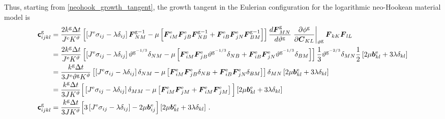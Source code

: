 \documentclass[10pt,letterpaper,oneside]{report}
\newcommand{\ten}[1]{\mbox{\boldmath $#1$}{}}
\newcommand{\tenf}[1]{\mbox{{\sffamily{\bfseries {#1}}}}}
\newcommand{\scas}[1]{\mbox{{\scriptsize{${\rm{#1}}$}}}{}}
\begin{document}
Thus, starting from \autoref{neohook_growth_tangent}, the growth tangent in the Eulerian configuration for the logarithmic neo-Hookean material model is 
\begin{align}
\tenf{c}^{\scas{g}}_{ijkl} 
={}& \frac{2 k^{\scas{g}} \Delta t}{J^{\scas{e}} K^\vartheta} \left[ \left[ J^{\scas{e}} \sigma_{ij} - \lambda \delta_{ij} \right] \ten{F}^{\scas{g}-1}_{NM} 
- \mu \left[ \ten{F}^{\scas{e}}_{iM} \ten{F}^{\scas{e}}_{jB} \ten{F}^{\scas{g}-1}_{NB} + \ten{F}^{\scas{e}}_{iB} \ten{F}^{\scas{e}}_{jN} \ten{F}^{\scas{g}-1}_{BM} \right] \right] 
\frac{d \ten{F}^{\scas{g}}_{MN}}{d \vartheta^{\scas{g}}} \left. \frac{\partial \phi^{\scas{g}} }{\partial \ten{C}_{KL}} \right|_{\vartheta^{\scas{g}}} \ten{F}_{kK} \ten{F}_{lL} 
\notag \\
={}& \frac{2 k^{\scas{g}} \Delta t}{J^{\scas{e}} K^\vartheta} \left[ \left[ J^{\scas{e}} \sigma_{ij} - \lambda \delta_{ij} \right] \vartheta^{\scas{g}^{-1/3}} \delta_{NM} 
- \mu \left[ \ten{F}^{\scas{e}}_{iM} \ten{F}^{\scas{e}}_{jB} \vartheta^{\scas{g}^{-1/3}} \delta_{NB} + \ten{F}^{\scas{e}}_{iB} \ten{F}^{\scas{e}}_{jN} \vartheta^{\scas{g}^{-1/3}} \delta_{BM} \right] \right] 
\frac{1}{3} \vartheta^{\scas{g}^{-2/3}} \delta_{MN} \frac{1}{2} \left[ 2 \mu \ten{b}^{\scas{e}}_{kl} + 3 \lambda \delta_{kl} \right] 
\notag \\
={}& \frac{k^{\scas{g}} \Delta t}{3 J^{\scas{e}} \vartheta^{\scas{g}} K^\vartheta} \left[ \left[ J^{\scas{e}} \sigma_{ij} - \lambda \delta_{ij} \right] \delta_{NM} 
- \mu \left[ \ten{F}^{\scas{e}}_{iM} \ten{F}^{\scas{e}}_{jB} \delta_{NB} + \ten{F}^{\scas{e}}_{iB} \ten{F}^{\scas{e}}_{jN} \delta_{BM} \right] \right] 
\delta_{MN} \left[ 2 \mu \ten{b}^{\scas{e}}_{kl} + 3 \lambda \delta_{kl} \right] 
\notag \\
={}& \frac{ k^{\scas{g}} \Delta t}{3 J K^\vartheta} \Big[ \left[ J^{\scas{e}} \sigma_{ij} - \lambda \delta_{ij} \right] \delta_{MM} 
- \mu \left[ \ten{F}^{\scas{e}}_{iM} \ten{F}^{\scas{e}}_{jM} + \ten{F}^{\scas{e}}_{iM} \ten{F}^{\scas{e}}_{jM} \right] \Big] 
\left[ 2 \mu \ten{b}^{\scas{e}}_{kl} + 3 \lambda \delta_{kl} \right] 
\notag \\
\tenf{c}^{\scas{g}}_{ijkl} 
={}& \frac{ k^{\scas{g}} \Delta t}{3 J K^\vartheta} \Big[ 3 \left[ J^{\scas{e}} \sigma_{ij} - \lambda \delta_{ij} \right] 
- 2 \mu \ten{b}^{\scas{e}}_{ij} \Big] 
\left[ 2 \mu \ten{b}^{\scas{e}}_{kl} + 3 \lambda \delta_{kl} \right] \, .  
\end{align}


\end{document}
